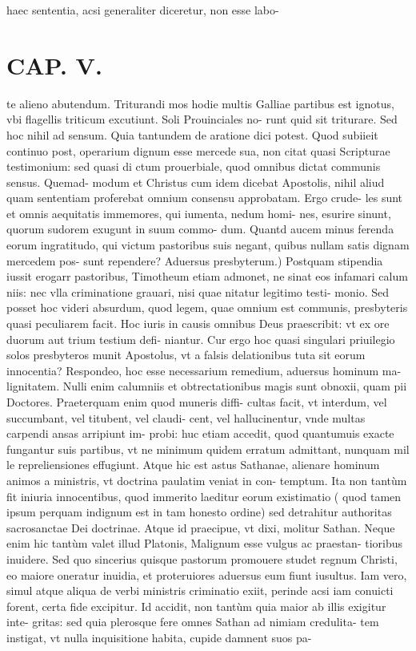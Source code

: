 \documentclass{article}
\begin{document}
\begin{pages}
haec sententia, acsi generaliter diceretur, non esse labo-  \pend
{}
{}
\subsection*{\textit{}}
\section*{CAP. V. }
\marginpar{[ p.67 ]}\pstart te alieno abutendum. Triturandi mos hodie multis Galliae partibus est ignotus, vbi flagellis triticum excutiunt. Soli Prouinciales no- runt quid sit triturare. Sed hoc nihil ad sensum. Quia tantundem de aratione dici potest. Quod subiieit continuo post, operarium dignum esse mercede sua, non citat quasi Scripturae testimonium: sed quasi di ctum prouerbiale, quod omnibus dictat communis sensus. Quemad- modum et Christus cum idem dicebat Apostolis, nihil aliud quam sententiam proferebat omnium consensu approbatam. Ergo crude- les sunt et omnis aequitatis immemores, qui iumenta, nedum homi- nes, esurire sinunt, quorum sudorem exugunt in suum commo- dum. Quantd aucem minus ferenda eorum ingratitudo, qui victum pastoribus suis negant, quibus nullam satis dignam mercedem pos- sunt rependere?  \pend\pstart Aduersus presbyterum.) Postquam stipendia iussit erogarr pastoribus, Timotheum etiam admonet, ne sinat eos infamari calum niis: nec vlla criminatione grauari, nisi quae nitatur legitimo testi- monio. Sed posset hoc videri absurdum, quod legem, quae omnium est communis, presbyteris quasi peculiarem facit. Hoc iuris in causis omnibus Deus praescribit: vt ex ore duorum aut trium testium defi- niantur. Cur ergo hoc quasi singulari priuilegio solos presbyteros munit Apostolus, vt a falsis delationibus tuta sit eorum innocentia? Respondeo, hoc esse necessarium remedium, aduersus hominum ma- lignitatem. Nulli enim calumniis et obtrectationibus magis sunt obnoxii, quam pii Doctores. Praeterquam enim quod muneris diffi- cultas facit, vt interdum, vel succumbant, vel titubent, vel claudi- cent, vel hallucinentur, vnde multas carpendi ansas arripiunt im- probi: huc etiam accedit, quod quantumuis exacte fungantur suis partibus, vt ne minimum quidem erratum admittant, nunquam mil le repreliensiones effugiunt. Atque hic est astus Sathanae, alienare hominum animos a ministris, vt doctrina paulatim veniat in con- temptum. Ita non tantùm fit iniuria innocentibus, quod immerito laeditur eorum existimatio ( quod tamen ipsum perquam indignum est in tam honesto ordine) sed detrahitur authoritas sacrosanctae Dei doctrinae. Atque id praecipue, vt dixi, molitur Sathan. Neque enim hic tantùm valet illud Platonis, Malignum esse vulgus ac praestan- tioribus inuidere. Sed quo sincerius quisque pastorum promouere studet regnum Christi, eo maiore oneratur inuidia, et proteruiores aduersus eum fiunt iusultus. Iam vero, simul atque aliqua de verbi ministris criminatio exiit, perinde acsi iam conuicti forent, certa fide excipitur. Id accidit, non tantùm quia maior ab illis exigitur inte- gritas: sed quia plerosque fere omnes Sathan ad nimiam credulita- tem instigat, vt nulla inquisitione habita, cupide damnent suos pa-  \pend

\end{pages}
\end{document}
